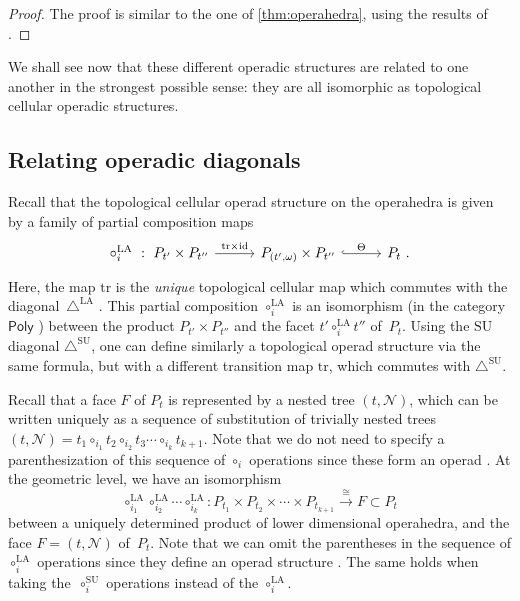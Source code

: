 \documentclass{amsart}
\theoremstyle{definition}
\newcommand{\SU}{\mathrm{SU}}
\newcommand{\LA}{\mathrm{LA}}
\newcommand{\SUD}{\triangle^{\mathrm{SU}}}
\newcommand{\LAD}{\triangle^{\mathrm{LA}}}
\newcommand{\PolySub}{\mathsf{Poly}}
\newcommand{\tr}{\mathrm{tr}}
\newcommand{\id}{\mathrm{id}}
\begin{document}
\begin{proof}
    The proof is similar to the one of \cref{thm:operahedra}, using the results of \cite{MazuirLA22}.
\end{proof}

We shall see now that these different operadic structures are related to one another in the strongest possible sense: they are all isomorphic as topological cellular operadic structures.


\subsection{Relating operadic diagonals} 


Recall that the topological cellular operad structure on the operahedra \cite[Def. 4.17]{LA21} is given by a family of partial composition maps 
\[
\vcenter{\hbox{
\begin{tikzcd}[column sep=1cm]
\circ_i^{\LA}\ : \ P_{t'}\times P_{t''}
\arrow[r,  "\tr\times \id"]
& P_{(t',\omega)}\times P_{t''}
 \arrow[r,hookrightarrow, "\Theta"]
&
P_t \ .
\end{tikzcd}
}}  \]
Here, the map $\tr$ is the \emph{unique} topological cellular map which commutes with the diagonal~$\LAD$ \cite[Prop. 7]{masudaDiagonalAssociahedra2021}. 
This partial composition $\circ_i^\LA$ is an isomorphism (in the category $\PolySub$ \cite[Def. 4.13]{LA21}) between the product $P_{t'}\times P_{t''}$ and the facet $t' \circ_i^\LA t''$ of~$P_t$.
Using the $\SU$ diagonal $\SUD$, one can define similarly a topological operad structure via the same formula, but with a different transition map $\tr$, which commutes with $\SUD$.

Recall that a face $F$ of $P_t$ is represented by a nested tree $(t,\mathcal{N})$, which can be written uniquely as a sequence of substitution of trivially nested trees 
$(t,\mathcal{N})=t_1\circ_{i_1} t_2 \circ_{i_2} t_3 \cdots \circ_{i_k} t_{k+1}$.
Note that we do not need to specify a parenthesization of this sequence of $\circ_i$ operations since these form an operad \cite[Def. 4.7]{LA21}.
At the geometric level, we have an isomorphism
\[\circ_{i_1}^\LA \circ_{i_2}^\LA \cdots \circ_{i_k}^\LA: P_{t_1} \times P_{t_2} \times \cdots \times P_{t_{k+1}} \overset{\cong}{\longrightarrow} F \subset P_t \]
between a uniquely determined product of lower dimensional operahedra, and the face $F=(t,\mathcal{N})$ of~$P_t$.
Note that we can omit the parentheses in the sequence of $\circ_i^\LA$ operations since they define an operad structure \cite[Thm 4.18]{LA21}.
The same holds when taking the~$\circ_i^\SU$ operations instead of the $\circ_i^\LA$. 
\end{document}
